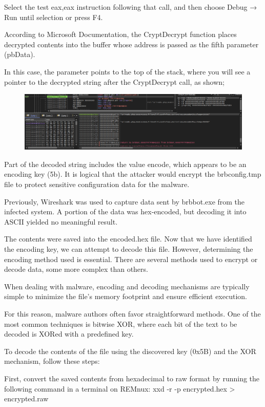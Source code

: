 \documentclass[]{project_plan}
\begin{document}
Select the test eax,eax instruction following that call, and then choose Debug
→ Run until selection or press F4.

According to Microsoft Documentation, the CryptDecrypt function places
decrypted contents into the buffer whose address is passed as the fifth parameter
(pbData).

In this case, the parameter points to the top of the stack, where you
will see a pointer to the decrypted string after the CryptDecrypt call, as shown;

\begin{figure}[H]
  \centering
  \includegraphics[width=\linewidth]{5b.png}
\end{figure}

Part of the decoded string includes the value encode, which appears to
be an encoding key (5b). It is logical that the attacker would encrypt the
brbconfig.tmp file to protect sensitive configuration data for the malware.

Previously, Wireshark was used to capture data sent by brbbot.exe from
the infected system. A portion of the data was hex-encoded, but decoding
it into ASCII yielded no meaningful result.

The contents were saved into the
encoded.hex file. Now that we have identified the encoding key, we can attempt
to decode this file. However, determining the encoding method used is essential.
There are several methods used to encrypt or decode data, some more complex
than others.

When dealing with malware, encoding and decoding mechanisms
are typically simple to minimize the file’s memory footprint and ensure
efficient execution.

For this reason, malware authors often favor straightforward
methods. One of the most common techniques is bitwise XOR, where each bit of
the text to be decoded is XORed with a predefined key.

To decode the contents of the file using the discovered key (0x5B) and the
XOR mechanism, follow these steps:

First, convert the saved contents from hexadecimal to raw format by running
the following command in a terminal on REMnux:
xxd -r -p encrypted.hex > encrypted.raw
\end{document}
